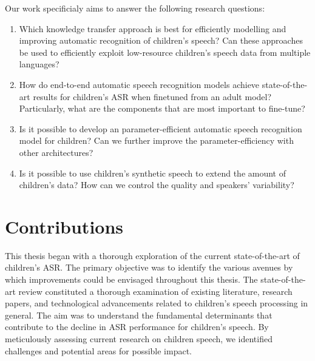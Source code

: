 Our work specificialy aims to answer the following research questions:
\begin{enumerate} 
\item Which knowledge transfer approach is best for efficiently modelling and improving automatic recognition of children's speech? Can these approaches be used to efficiently exploit low-resource children's speech data from multiple languages?
\item  How do end-to-end automatic speech recognition models achieve state-of-the-art results for children's \ac{ASR} when finetuned from an adult model? Particularly, what are the components that are most important to fine-tune?
\item Is it possible to develop an parameter-efficient automatic speech recognition model for children? Can we further improve the parameter-efficiency with other architectures? 
\item Is it possible to use children's synthetic speech to extend the amount of children's data? How can we control the quality and speakers’ variability?
\end{enumerate}

\section{Contributions}
This thesis began with a thorough exploration of the current state-of-the-art of children's \ac{ASR}. The primary objective was to identify the various avenues by which improvements could be envisaged throughout this thesis. The state-of-the-art review constituted a thorough examination of existing literature, research papers, and technological advancements related to children's speech processing in general. The aim was to understand the fundamental determinants that contribute to the decline in \ac{ASR} performance for children's speech. By meticulously assessing current research on children speech, we identified challenges and potential areas for possible impact.

